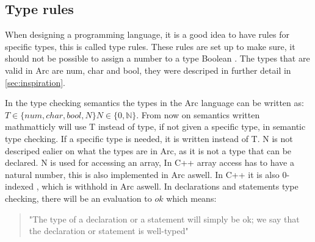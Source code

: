 \subsection{Type rules}\label{subsec:typerules}





When designing a programming language, it is a good idea to have rules for specific types, this is called type rules. These rules are set up to make sure, it should not be possible to assign a number to a type Boolean \cite*{Sebesta2016}. 
The types that are valid in Arc are num, char and bool, they were descriped in further detail in \ref*{sec:inspiration}.

In the type checking semantics the types in the Arc language can be written as:
$T \in \{num, char, bool, N\} N \in \{ 0,\mathbb{N}\}$.
From now on semantics written mathmatticly will use T instead of type, if not given a specific type, in semantic type checking. If a specific type is needed, it is written instead of T.
N is not descriped ealier on what the types are in Arc, as it is not a type that can be declared. N is used for accessing an array, In C++ array access has to have a natural number, this is also implemented in Arc aswell. In C++ it is also 0-indexed \cite{cppreferenceDataTypes}, which is withhold in Arc aswell.  
In declarations and statements type checking, there will be an evaluation to $ok$ which means: \begin{quote}
    "The type of a declaration or a statement will simply be ok; we say that
the declaration or statement is well-typed"\cite{Huttel2010}
\end{quote}

